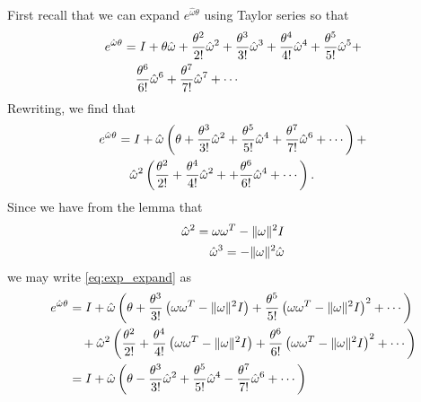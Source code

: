\begin{solution}
	First recall that we can expand $e^{\hat{\omega}\theta}$ using Taylor series so that 
	\begin{align}
		e^{\hat{\omega}\theta} &= I + \theta \hat{\omega} + \frac{\theta^2}{2!}\hat{\omega}^2 + \frac{\theta^3}{3!}\hat{\omega}^3 + \frac{\theta^4}{4!}\hat{\omega}^4 +  \frac{\theta^5}{5!}\hat{\omega}^5 + \nonumber \\
		&\quad  \frac{\theta^6}{6!}\hat{\omega}^6 + \frac{\theta^7}{7!}\hat{\omega}^7 + \cdots
	\end{align}
	Rewriting, we find that
	\begin{align}
	e^{\hat{\omega}\theta} &= \identity + \hat{\omega} \left(\theta + \frac{\theta^3}{3!}\hat{\omega}^2  + \frac{\theta^5}{5!}\hat{\omega}^4 + \frac{\theta^7}{7!}\hat{\omega}^6  + \cdots \right)   + \nonumber \\
	&\quad  
	\hat{\omega}^2 \left( \frac{\theta^2}{2!} + \frac{\theta^4}{4!}\hat{\omega}^2 + + \frac{\theta^6}{6!}\hat{\omega}^4  + \cdots \right).
	\label{eq:exp_expand}
	\end{align}
	Since we have from the lemma that 
	\begin{subequations}
		\begin{align}
		\hat{\omega}^2 = \omega \omega^T - \|\omega\|^2 I  \\
		\hat{\omega}^3 = - \|\omega\|^2 \hat{\omega}
		\end{align}
	\end{subequations}
	we may write \eqref{eq:exp_expand} as 
	\begin{align}
	e^{\hat{\omega}\theta} &= I + \hat{\omega} \left(\theta + \frac{\theta^3}{3!}\left(\omega \omega^T - \|\omega\|^2 \identity\right)  + \frac{\theta^5}{5!}\left(\omega \omega^T - \|\omega\|^2 \identity\right)^2 %
	+ \cdots \right) \nonumber \\
	&\quad +
	\hat{\omega}^2 \left( \frac{\theta^2}{2!} + \frac{\theta^4}{4!}\left(\omega \omega^T - \|\omega\|^2 \identity \right) + \frac{\theta^6}{6!}\left(\omega \omega^T - \|\omega\|^2 \identity \right)^2  %
	 + \cdots \right) \nonumber \\
	&= \identity + \hat{\omega} \left(\theta - \frac{\theta^3}{3!}\hat{\omega}^2  + \frac{\theta^5}{5!}\hat{\omega}^4 - \frac{\theta^7}{7!}\hat{\omega}^6  + \cdots \right)   \nonumber \\

\end{align}
\end{solution}
